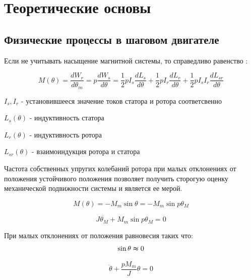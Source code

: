 \newpage
\section{ Теоретические основы }




\subsection{ Физические процессы в шаговом двигателе }
Если не учитывать насыщение магнитной системы, то справедливо равенство \cite[стр. 82]{Chilikin}:

\begin{equation}
\label{step_motor_torque_common}
    M(\theta)
    = \frac{dW_r}{d\theta_m}
    = p \frac{dW_s}{d\theta}
    = \frac{1}{2} p I_s \frac{dL_s}{d\theta}
        + \frac{1}{2} p I_r \frac{dL_r}{d\theta}
        + \frac{1}{2} p I_{s} I_r \frac{dL_{sr}}{d\theta}
\end{equation}

$I_{s}, I_{r}$ - установившееся значение токов статора и ротора соответсвенно

$L_{s}(\theta)$ - индуктивность статора

$L_{r}(\theta)$ - индуктивность ротора

$L_{sr}(\theta)$ - взаимоиндукция ротора и статора

Частота собственных упругих колебаний ротора \cite[гл 3.1]{Chilikin} при малых отклонениях от положения устойчивого
положения позволяет получить сторогую оценку механической подвижности системы и является ее мерой.

\begin{equation}
\label{step_motor_torque_without_load_and_with_unstable_rotor}
    M(\theta)
    = - M_{m} \sin{\theta}
    = - M_{m} \sin{p\theta_{M}}
\end{equation}

\begin{equation}
\label{step_motor_dynamic_move_equation}
    J \ddot{ \theta_{M} } + M_{m} \sin{p \theta_{M}} = 0
\end{equation}

При малых отклонениях от положения равновесия таких что:
\begin{equation}
    \sin{\theta} \thickapprox 0
\end{equation}

\begin{equation}
    \label{rotor_like_harmonical_oscilator_equation}
    \ddot{\theta} + \frac{p M_{m}}{J} \theta = 0
\end{equation}

